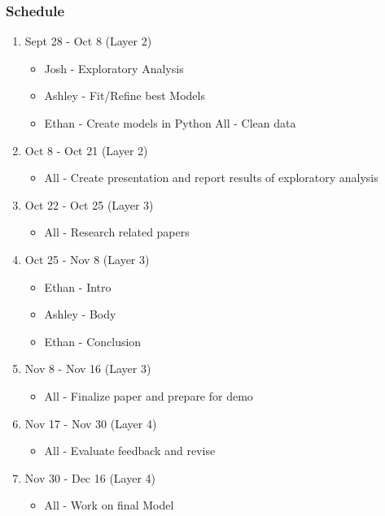 \documentclass{beamer}
\begin{document}
\begin{frame}
\frametitle{Schedule}
  \begin{enumerate}
    \item Sept 28 - Oct 8 (Layer 2)
      \begin{itemize}
        \item Josh - Exploratory Analysis
        \item Ashley - Fit/Refine best Models
        \item Ethan - Create models in Python
        \itme All - Clean data 
      \end{itemize}
      
    \item Oct 8 - Oct 21 (Layer 2)
      \begin{itemize}
        \item All - Create presentation and report results of exploratory analysis
      \end{itemize}
    
    \item Oct 22 - Oct 25 (Layer 3)
      \begin{itemize}
        \item All - Research related papers
      \end{itemize}
    
    \item Oct 25 - Nov 8 (Layer 3)
      \begin{itemize}
        \item Ethan - Intro
        \item Ashley - Body
        \item Ethan - Conclusion
      \end{itemize}
    
    \item Nov 8 - Nov 16 (Layer 3)
      \begin{itemize}
        \item All - Finalize paper and prepare for demo
      \end{itemize}
      
    \item Nov 17 - Nov 30 (Layer 4)
      \begin{itemize}
        \item All - Evaluate feedback and revise
       \end{itemize}
       
    \item Nov 30 - Dec 16 (Layer 4)
      \begin{itemize}
        \item All - Work on final Model
      \end{itemize}
  \end{enumerate}
\end{frame}
\end{document}
